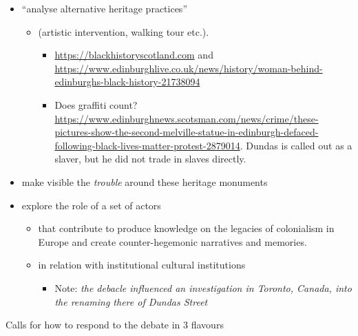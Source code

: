 \documentclass{scrartcl}
\begin{document}
\begin{itemize}
    \item ``analyse alternative heritage practices''
    \begin{itemize}
        \item  (artistic intervention, walking tour etc.).
        \begin{itemize}
            \begin{itemize}
                \item \url{https://blackhistoryscotland.com} and \url{https://www.edinburghlive.co.uk/news/history/woman-behind-edinburghs-black-history-21738094}
            \end{itemize}
        \end{itemize}
        \begin{itemize}
            \item Does graffiti count? \url{https://www.edinburghnews.scotsman.com/news/crime/these-pictures-show-the-second-melville-statue-in-edinburgh-defaced-following-black-lives-matter-protest-2879014}. Dundas is called out as a slaver, but he did not trade in slaves directly.
        \end{itemize}
    \end{itemize}
    \item make visible the \textit{trouble} around these heritage monuments
    \item explore the role of a set of actors
    \begin{itemize}
        \item that contribute to produce knowledge on the legacies of colonialism in Europe and create counter-hegemonic narratives and memories.
        \item in relation with institutional cultural institutions
        \begin{itemize}
            \item Note: \textit{the debacle influenced an investigation in Toronto, Canada, into the renaming there of Dundas Street} \cite{mccarthy_2022_1}
        \end{itemize}
    \end{itemize}
\end{itemize}

Calls for how to respond to the debate in 3 flavours
\end{document}
